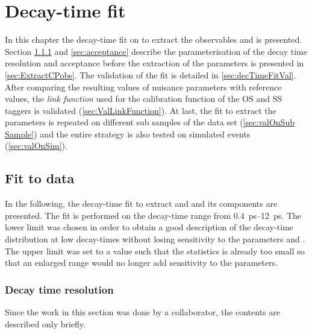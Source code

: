 \chapter{Decay-time fit}
\label{chap:dectimeFit}

\linespread{1.08}\selectfont
In this chapter the decay-time fit on \BdToDpi to extract the \CP observables \Sf and \Sfbar is presented.
Section \ref{sec:resolution} and \ref{sec:acceptance} describe the parameterisation of the decay time resolution and acceptance before the extraction of the \CP parameters is presented in \cref{sec:ExtractCPobs}.
The validation of the fit is detailed in \cref{sec:decTimeFitVal}.
After comparing the resulting values of nuisance parameters with reference values, the \emph{link function} used for the calibration function of the OS and SS taggers is validated (\cref{sec:ValLinkFunction}).
At last, the fit to extract the \CP parameters is repeated on different sub samples of the data set (\cref{sec:valOnSub Sample}) and the entire strategy is also tested on simulated events (\cref{sec:valOnSim}).

\section{Fit to data}

In the following, the decay-time fit to extract \Sf and \Sfbar and its components are presented.
The fit is performed on the decay-time range from \SIrange[range-units=single]{0.4}{12}{\pico\second}.
The lower limit was chosen in order to obtain a good description of the decay-time distribution at low decay-times without losing sensitivity to the parameters \Sf and \Sfbar.
The upper limit was set to a value such that the statistics is already too small so that an enlarged range would no longer add sensitivity to the \CP parameters.

\subsection{Decay time resolution}
\label{sec:resolution}

Since the work in this section was done by a collaborator, the contents are described only briefly.

